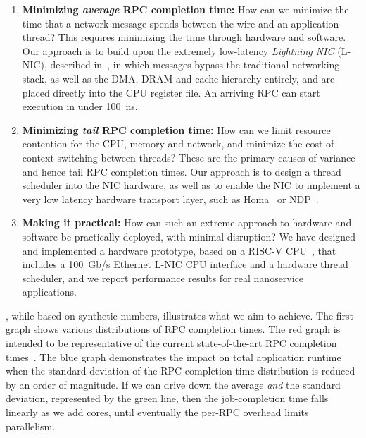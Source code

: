 \begin{enumerate}[topsep=0.4\baselineskip, leftmargin=20pt]
    \item {\bf Minimizing {\em average} RPC completion time:} How can we minimize the time that a network message spends between the wire and an application thread?
    This requires minimizing the time through hardware and software. Our approach is to build upon the extremely low-latency {\em Lightning NIC} (L-NIC), described in~\cite{lnic}, in which messages bypass the traditional networking stack, as well as the DMA, DRAM and cache hierarchy entirely, and are placed directly into the CPU register file.
    An arriving RPC can start execution in under \SI{100}{ns}. 
    \item {\bf Minimizing {\em tail} RPC completion time:} How can we limit resource contention for the CPU, memory and network, and minimize the cost of context switching between threads?
    These are the primary causes of variance and hence tail RPC completion times.
    Our approach is to design a thread scheduler into the NIC hardware, as well as to enable the NIC to implement a very low latency hardware transport layer, such as Homa~\cite{homa} or NDP~\cite{ndp}.
    \item {\bf Making it practical:} How can such an extreme approach to hardware and software be practically deployed, with minimal disruption? 
    We have designed and implemented a hardware prototype, based on a RISC-V CPU~\cite{rocket-chip}, that includes a \SI{100}{Gb/s} Ethernet L-NIC CPU interface and a hardware thread scheduler, and we report performance results for real nanoservice applications.
\end{enumerate}

, while based on synthetic numbers, illustrates what we aim to achieve.
The first graph shows various distributions of RPC completion times. 
The red graph is intended to be representative of the current state-of-the-art RPC completion times~\cite{eRPC}. The blue graph demonstrates the impact on total application runtime when the standard deviation of the RPC completion time distribution is reduced by an order of magnitude.
If we can drive down the average {\em and} the standard deviation, represented by the green line, then the job-completion time falls linearly as we add cores, until eventually the per-RPC overhead limits parallelism.

